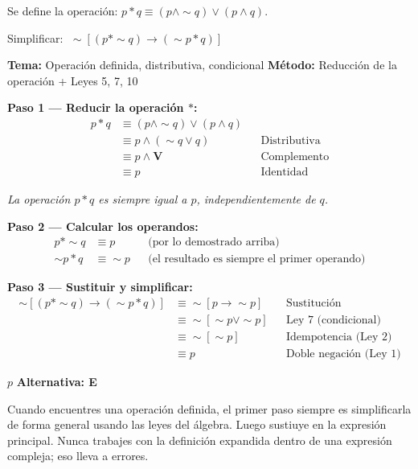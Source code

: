 \begin{tcolorbox}[
  enhanced, breakable,
  colback=GrisClaro, colframe=AzulPizarra,
  fonttitle=\bfseries\sffamily,
  title={Ejercicio 5 --- Nivel Avanzado: Operaci\'{o}n definida},
  arc=3pt, boxrule=0.8pt
]
\begin{problema}
  Se define la operación: $p \ast q \equiv (p \wedge \sim q) \vee (p \wedge q)$.

  Simplificar: $\;\sim[(p \ast \sim q) \rightarrow (\sim p \ast q)]$
\end{problema}

\smallskip
\noindent
\textbf{\sffamily\color{AzulMedio}Tema:} Operación definida, distributiva, condicional
\hfill
\textbf{\sffamily\color{AzulMedio}M\'{e}todo:} Reducción de la operación + Leyes 5, 7, 10

\medskip
\noindent\textbf{\sffamily Paso 1 — Reducir la operación $\ast$:}
\begin{align*}
  p \ast q
  &\equiv (p \wedge \sim q) \vee (p \wedge q) \\[4pt]
  &\equiv p \wedge (\sim q \vee q)
  && \text{Distributiva} \\[4pt]
  &\equiv p \wedge \mathbf{V}
  && \text{Complemento} \\[4pt]
  &\equiv p
  && \text{Identidad}
\end{align*}

\noindent\textit{La operación $p \ast q$ es siempre igual a $p$,
independientemente de $q$.}

\medskip
\noindent\textbf{\sffamily Paso 2 — Calcular los operandos:}
\begin{align*}
  p \ast \sim q &\equiv p
  && \text{(por lo demostrado arriba)} \\[4pt]
  \sim p \ast q &\equiv \sim p
  && \text{(el resultado es siempre el primer operando)}
\end{align*}

\medskip
\noindent\textbf{\sffamily Paso 3 — Sustituir y simplificar:}
\begin{align*}
  \sim[(p \ast \sim q) \rightarrow (\sim p \ast q)]
  &\equiv \sim[p \rightarrow \sim p]
  && \text{Sustituci\'{o}n} \\[6pt]
  &\equiv \sim[\sim p \vee \sim p]
  && \text{Ley 7 (condicional)} \\[6pt]
  &\equiv \sim[\sim p]
  && \text{Idempotencia (Ley 2)} \\[6pt]
  &\equiv p
  && \text{Doble negaci\'{o}n (Ley 1)}
\end{align*}

\medskip
\begin{tcolorbox}[
  colback=AzulClaro!60, colframe=AzulPizarra,
  arc=2pt, boxrule=0.8pt, left=8pt, right=8pt
]
\centering
$\displaystyle \boxed{p}$
\quad \textbf{Alternativa: E}
\end{tcolorbox}

\begin{cajatip}
  Cuando encuentres una operación definida, el primer paso siempre es
  simplificarla de forma general usando las leyes del álgebra. Luego
  sustiuye en la expresión principal. Nunca trabajes con la definición
  expandida dentro de una expresión compleja; eso lleva a errores.
\end{cajatip}
\end{tcolorbox}
